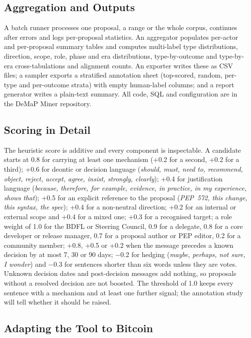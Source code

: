\documentclass[sigconf,screen]{acmart}
\begin{document}
\subsection{Aggregation and Outputs}
\label{sec:outputs}

A batch runner processes one proposal, a range or the whole corpus, continues after errors and logs per-proposal statistics. An aggregator populates per-actor and per-proposal summary tables and computes multi-label type distributions, direction, scope, role, phase and era distributions, type-by-outcome and type-by-era cross-tabulations and alignment counts. An exporter writes these as CSV files; a sampler exports a stratified annotation sheet (top-scored, random, per-type and per-outcome strata) with empty human-label columns; and a report generator writes a plain-text summary. All code, SQL and configuration are in the DeMaP Miner repository.

\subsection{Scoring in Detail}
\label{sec:scoring}

The heuristic score is additive and every component is inspectable. A candidate starts at 0.8 for carrying at least one mechanism (+0.2 for a second, +0.2 for a third); +0.6 for deontic or decision language (\emph{should, must, need to, recommend, object, reject, accept, agree, insist, strongly, clearly}); +0.4 for justification language (\emph{because, therefore, for example, evidence, in practice, in my experience, shows that}); +0.5 for an explicit reference to the proposal (\emph{PEP~572, this change, this syntax, the spec}); +0.4 for a non-neutral direction; +0.2 for an internal or external scope and +0.4 for a mixed one; +0.3 for a recognised target; a role weight of 1.0 for the BDFL or Steering Council, 0.9 for a delegate, 0.8 for a core developer or release manager, 0.7 for a proposal author or PEP editor, 0.2 for a community member; +0.8, +0.5 or +0.2 when the message precedes a known decision by at most 7, 30 or 90 days; $-$0.2 for hedging (\emph{maybe, perhaps, not sure, I wonder}) and $-$0.3 for sentences shorter than six words unless they are votes. Unknown decision dates and post-decision messages add nothing, so proposals without a resolved decision are not boosted. The threshold of 1.0 keeps every sentence with a mechanism and at least one further signal; the annotation study will tell whether it should be raised.

\subsection{Adapting the Tool to Bitcoin}
\label{sec:adaptation}
\end{document}
